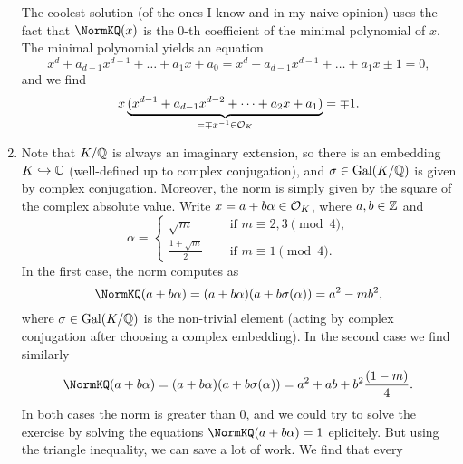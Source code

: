 \documentclass[a4paper,11pt]{article}
\begin{document}
\begin{enumerate}
        The coolest solution (of the ones I know and in my naive opinion) uses the fact that
        $\NormKQ(x)$ is the $0$-th coefficient of the minimal polynomial of
        $x$. The minimal polynomial yields an equation
        \begin{equation*}
            x^d + a_{d-1}x^{d-1} + \dots + a_1 x + a_0 = x^d + a_{d-1}x^{d-1} + \dots + a_1 x \pm 1 = 0,
        \end{equation*}
        and we find
        \begin{equation*}
            x\underbrace{(x^{d-1} + a_{d-1}x^{d-2} + \dots + a_2 x + a_1)}_{= \mp x^{-1} \in \mathcal{O}_K} = \mp 1.
        \end{equation*}
    \item 
        Note that $K/\mathbb{Q}$ is always an imaginary extension, so there is an
        embedding $K \hookrightarrow \mathbb{C}$ (well-defined up to complex conjugation), and
        $\sigma \in \operatorname{Gal}(K/\mathbb{Q})$ is given by complex conjugation. Moreover,
        the norm is simply given by the square of
        the complex absolute value.
        Write $x = a + b \alpha \in \mathcal{O}_K$, where $a, b \in \mathbb{Z}$ and 
        \begin{equation*}
            \alpha =    \begin{cases}
                            \sqrt m \quad &\text{ if } m \equiv 2,3 \pmod 4, \\
                            \frac{1+\sqrt m}2 \quad &\text{ if } m \equiv 1 \pmod 4.
                        \end{cases}
        \end{equation*}
        In the first case, the norm computes as
        \begin{equation*}
             \NormKQ (a + b \alpha) = (a + b \alpha)(a + b
            \sigma(\alpha)) =  a^2 - mb^2,
        \end{equation*}
        where $\sigma \in \operatorname{Gal}({K/\mathbb{Q}})$ is the non-trivial element (acting by 
        complex conjugation after choosing a complex embedding).
        In the second case we find similarly
        \begin{equation*}
             \NormKQ (a + b \alpha) = (a + b \alpha)(a + b
            \sigma(\alpha)) =  a^2 + ab + b^2 \frac{(1-m)}4.
        \end{equation*}
        In both cases the norm is greater than $0$, and we could try to solve
        the exercise by solving the equations
        $\NormKQ(a + b\alpha) = 1$ eplicitely. But using the triangle
        inequality, we can save a lot of work. We find that every

\end{enumerate}
\end{document}
